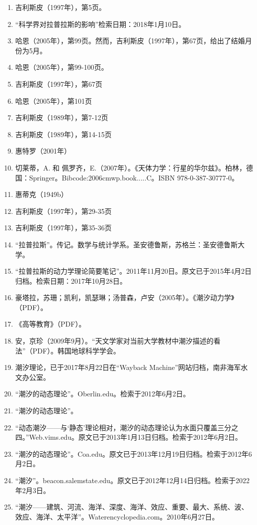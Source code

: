 \begin{enumerate}
\item 吉利斯皮（1997年），第5页。  
\item “科学界对拉普拉斯的影响”检索日期：2018年1月10日。  
\item 哈恩（2005年），第99页。然而，吉利斯皮（1997年），第67页，给出了结婚月份为5月。  
\item 哈恩（2005年），第99-100页。
\item 吉利斯皮（1997年），第67页  
\item 哈恩（2005年），第101页  
\item 吉利斯皮（1989年），第7-12页  
\item 吉利斯皮（1989年），第14-15页  
\item 惠特罗（2001年）  
\item 切莱蒂，A. 和 佩罗齐，E.（2007年）。《天体力学：行星的华尔兹》。柏林，德国：Springer。Bibcode:2006cmwp.book.....C。ISBN 978-0-387-30777-0。  
\item 惠蒂克（1949b）  
\item 吉利斯皮（1997年），第29-35页  
\item 吉利斯皮（1997年），第35-36页  
\item “拉普拉斯”。传记。数学与统计学系。圣安德鲁斯，苏格兰：圣安德鲁斯大学。  
\item “拉普拉斯的动力学理论简要笔记”。2011年11月20日。原文已于2015年4月2日归档。检索日期：2017年10月28日。  
\item 豪塔拉，苏珊；凯利，凯瑟琳；汤普森，卢安（2005年）。《潮汐动力学》（PDF）。  
\item 《高等教育》（PDF）。
\item 安，京珍（2009年9月）。“天文学家对当前大学教材中潮汐描述的看法”（PDF）。韩国地球科学学会。  
\item 潮汐理论，已于2017年8月22日在“Wayback Machine”网站归档，南非海军水文办公室。  
\item “潮汐的动态理论”。Oberlin.edu。检索于2012年6月2日。  
\item “潮汐的动态理论”。  
\item “动态潮汐——与‘静态’理论相对，潮汐的动态理论认为水面只覆盖三分之四。”Web.vims.edu。原文已于2013年1月13日归档。检索于2012年6月2日。  
\item “潮汐的动态理论”。Coa.edu。原文已于2013年12月19日归档。检索于2012年6月2日。  
\item “潮汐”。beacon.salemstate.edu。原文已于2012年12月14日归档。检索于2022年2月3日。  
\item “潮汐——建筑、河流、海洋、深度、海洋、效应、重要、最大、系统、波、效应、海洋、太平洋”。Waterencyclopedia.com。2010年6月27日。  

\end{enumerate}
